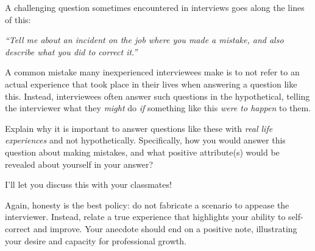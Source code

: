 

A challenging question sometimes encountered in interviews goes along the lines of this:

\vskip 10pt {\narrower \noindent \baselineskip5pt

{\it ``Tell me about an incident on the job where you made a mistake, and also describe what you did to correct it.''}

\par} \vskip 10pt

A common mistake many inexperienced interviewees make is to not refer to an actual experience that took place in their lives when answering a question like this.  Instead, interviewees often answer such questions in the hypothetical, telling the interviewer what they {\it might} do {\it if} something like this {\it were to happen} to them.

Explain why it is important to answer questions like these with {\it real life experiences} and not hypothetically.  Specifically, how you would answer this question about making mistakes, and what positive attribute(s) would be revealed about yourself in your answer?

\vskip 50pt







I'll let you discuss this with your classmates!







Again, honesty is the best policy: do not fabricate a scenario to appease the interviewer.  Instead, relate a true experience that highlights your ability to self-correct and improve.  Your anecdote should end on a positive note, illustrating your desire and capacity for professional growth.





